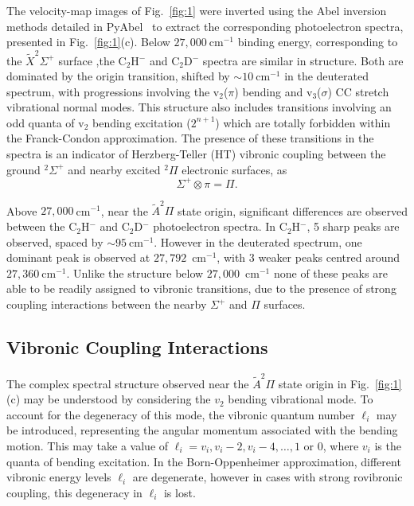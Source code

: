 \documentclass[aip,graphicx]{revtex4-1}
\begin{document}
The velocity-map images of Fig.~\ref{fig:1} were inverted using the Abel inversion methods detailed in PyAbel~\cite{hic19} to extract the corresponding photoelectron spectra, presented in Fig.~\ref{fig:1}(c). Below $27,000~$cm$^{-1}$ binding energy, corresponding to the $\tilde{X} ^2\Sigma^+$ surface ,the C$_2$H$^-$ and C$_2$D$^-$ spectra are similar in structure. Both are dominated by the origin transition, shifted by $\sim10~$cm$^{-1}$ in the deuterated spectrum, with progressions involving the v$_2$($\pi$) bending and v$_3$($\sigma$) CC stretch vibrational normal modes. This structure also includes transitions involving an odd quanta of v$_2$ bending excitation ($2^{n+1}$) which are totally forbidden within the Franck-Condon approximation. The presence of these transitions in the spectra is an indicator of Herzberg-Teller (HT) vibronic coupling between the ground $^2\Sigma^+$ and nearby excited $^2\Pi$ electronic surfaces, as
\begin{equation}
\Sigma^+ \otimes \pi = \Pi. 
\end{equation}

Above $27,000~$cm$^{-1}$, near the $\tilde{A}^2\Pi$ state origin, significant differences are observed between the C$_2$H$^-$ and C$_2$D$^-$ photoelectron spectra. In C$_2$H$^-$, 5 sharp peaks are observed, spaced by $\sim95~$cm$^{-1}$. However in the deuterated spectrum, one dominant peak is observed at $27,792$~cm$^{-1}$, with 3 weaker peaks centred around $27,360~$cm$^{-1}$. Unlike the structure below $27,000$~cm$^{-1}$ none of these peaks are able to be readily assigned to vibronic transitions, due to the presence of strong coupling interactions between the nearby $\Sigma^+$ and $\Pi$ surfaces.




\subsection{Vibronic Coupling Interactions}
The complex spectral structure observed near the $\tilde{A}^2\Pi$ state origin in Fig.~\ref{fig:1}(c) may be understood by considering the $v_2$ bending vibrational mode. To account for the degeneracy of this mode, the vibronic quantum number $\ell_i$ may be introduced, representing the angular momentum associated with the bending motion. This may take a value of $\ell_i = v_i, v_i-2, v_i-4,\dots,1$ or $0$, where $v_i$ is the quanta of bending excitation. In the Born-Oppenheimer approximation, different vibronic energy levels $\ell_i$ are degenerate, however in cases with strong rovibronic coupling, this degeneracy in $\ell_i$ is lost. 
\end{document}
